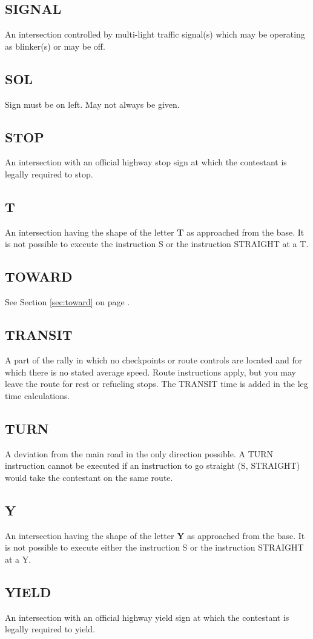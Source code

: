 \subsection{SIGNAL}
An intersection controlled by multi-light traffic signal(s) which may be operating as blinker(s) or may be off.

\subsection{SOL}
Sign must be on left.  May not always be given.

\subsection{STOP}
An intersection with an official highway stop sign at which the contestant is legally required to stop.

\subsection{T}
An intersection having the shape of the letter \textbf{T} as approached from the base.  It is not possible to execute the instruction S or the instruction STRAIGHT at a T.

\subsection{TOWARD}
See Section \ref{sec:toward} on page \pageref{sec:toward}.

\subsection{TRANSIT}
A part of the rally in which no checkpoints or route controls are located and for which there is no stated average speed.  Route instructions apply, but you may leave the route for rest or refueling stops.  The TRANSIT time is added in the leg time calculations.

\subsection{TURN}
A deviation from the main road in the only direction possible.  A TURN instruction cannot be executed if an instruction to go straight (S, STRAIGHT) would take the contestant on the same route.

\subsection{Y}
An intersection having the shape of the letter \textbf{Y} as approached from the base.  It is not possible to execute either the instruction S or the instruction STRAIGHT at a Y.

\subsection{YIELD}
An intersection with an official highway yield sign at which the contestant is legally required to yield.
